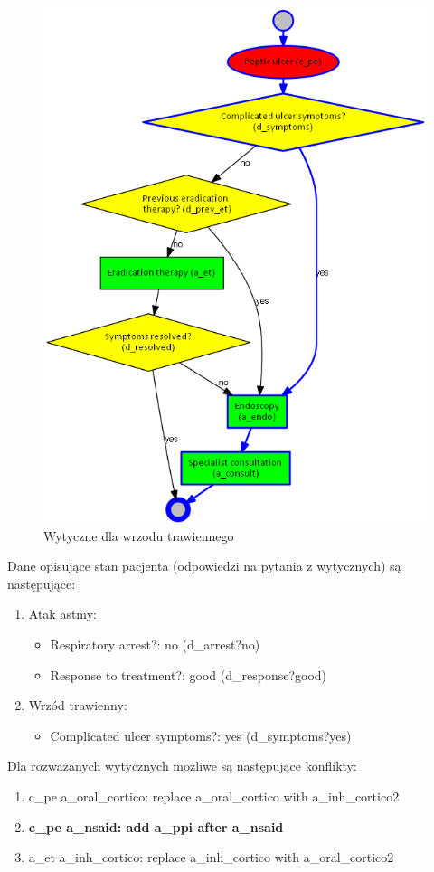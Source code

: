 \begin{figure}[H]
\centering
\includegraphics[scale=0.45]{img/peptic-ulcer.png}
\caption{Wytyczne dla wrzodu trawiennego}
\label{fig:pu}
\end{figure}
Dane opisujące stan pacjenta (odpowiedzi na pytania z wytycznych) są następujące:
\begin{enumerate}
\item{Atak astmy:
	\begin{itemize}
	\item{Respiratory arrest?: no (d\_arrest?no)}
	\item{Response to treatment?: good (d\_response?good)}
	\end{itemize}
}
\item{Wrzód trawienny:
	\begin{itemize}
	\item{Complicated ulcer symptoms?: yes (d\_symptoms?yes)}
	\end{itemize}
}
\end{enumerate}
Dla rozważanych wytycznych możliwe są następujące konflikty:
\begin{enumerate}
\item c\_pe a\_oral\_cortico: replace a\_oral\_cortico with a\_inh\_cortico2
\item \textbf{c\_pe a\_nsaid: add a\_ppi after a\_nsaid}
\item a\_et a\_inh\_cortico: replace a\_inh\_cortico with a\_oral\_cortico2
\end{enumerate}

